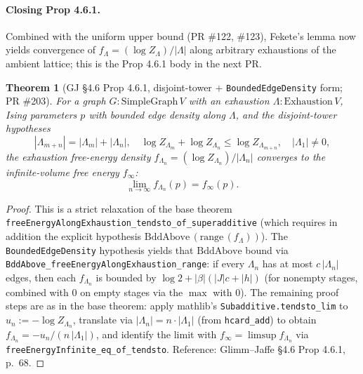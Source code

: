\documentclass[a4paper,11pt]{article}
\newtheorem{theorem}{Theorem}
\begin{document}
\paragraph{Closing Prop 4.6.1.} Combined with the uniform upper
bound (PR \#122, \#123), Fekete's lemma now yields
convergence of $f_\Lambda = (\log Z_\Lambda)/|\Lambda|$ along
arbitrary exhaustions of the ambient lattice; this is the
Prop 4.6.1 body in the next PR.

\begin{theorem}[GJ \S 4.6 Prop 4.6.1, disjoint-tower \(+\)
\texttt{BoundedEdgeDensity} form; PR \#203]
For a graph $G : \mathrm{SimpleGraph}\, V$ with an exhaustion
$\Lambda : \mathrm{Exhaustion}\, V$, Ising parameters $p$ with
bounded edge density along $\Lambda$, and the disjoint-tower
hypotheses
\[
  |\Lambda_{m+n}| = |\Lambda_m| + |\Lambda_n|, \quad
  \log Z_{\Lambda_m} + \log Z_{\Lambda_n}
    \le \log Z_{\Lambda_{m+n}}, \quad
  |\Lambda_1| \neq 0,
\]
the exhaustion free-energy density $f_{\Lambda_n}
= (\log Z_{\Lambda_n})/|\Lambda_n|$ converges to the
infinite-volume free energy $f_\infty$:
\[
  \lim_{n\to\infty} f_{\Lambda_n}(p) = f_\infty(p).
\]
\end{theorem}

\begin{proof}
This is a strict relaxation of the base theorem
\texttt{freeEnergyAlongExhaustion\_tendsto\_of\_superadditive}
(which requires in addition the explicit hypothesis
$\mathrm{BddAbove}\,(\mathrm{range}\,(f_\Lambda))$).
The \texttt{BoundedEdgeDensity} hypothesis yields that
$\mathrm{BddAbove}$ bound via
\texttt{BddAbove\_freeEnergyAlongExhaustion\_range}: if every
$\Lambda_n$ has at most $c\,|\Lambda_n|$ edges, then each
$f_{\Lambda_n}$ is bounded by
$\log 2 + |\beta|(|J|c + |h|)$ (for nonempty stages, combined with
$0$ on empty stages via the $\max$ with $0$).
The remaining proof steps are as in the base theorem: apply
mathlib's \texttt{Subadditive.tendsto\_lim} to
$u_n := -\log Z_{\Lambda_n}$, translate via $|\Lambda_n| =
n\cdot|\Lambda_1|$ (from \texttt{hcard\_add}) to obtain
$f_{\Lambda_n} = -u_n/(n\,|\Lambda_1|)$, and identify the limit
with $f_\infty = \limsup f_{\Lambda_n}$ via
\texttt{freeEnergyInfinite\_eq\_of\_tendsto}. Reference:
Glimm--Jaffe \cite{glimm-jaffe} \S 4.6 Prop 4.6.1, p.~68.
\end{proof}
\end{document}
